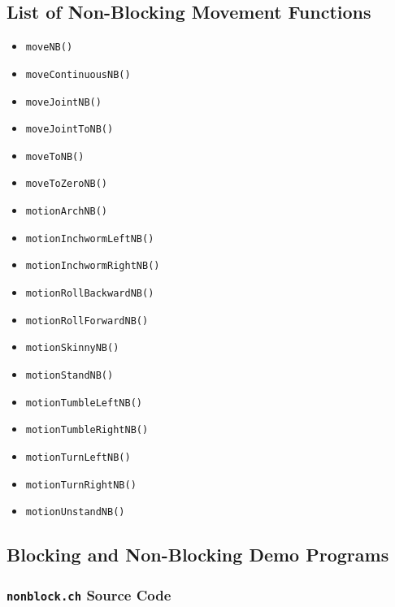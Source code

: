 \documentclass{article}
\begin{document}
\subsection{List of Non-Blocking Movement Functions}
\begin{itemize}
\item \texttt{moveNB()}
\item \texttt{moveContinuousNB()}
\item \texttt{moveJointNB()}
\item \texttt{moveJointToNB()}
\item \texttt{moveToNB()}
\item \texttt{moveToZeroNB()}
\item \texttt{motionArchNB()}
\item \texttt{motionInchwormLeftNB()}
\item \texttt{motionInchwormRightNB()}
\item \texttt{motionRollBackwardNB()}
\item \texttt{motionRollForwardNB()}
\item \texttt{motionSkinnyNB()}
\item \texttt{motionStandNB()}
\item \texttt{motionTumbleLeftNB()}
\item \texttt{motionTumbleRightNB()}
\item \texttt{motionTurnLeftNB()}
\item \texttt{motionTurnRightNB()}
\item \texttt{motionUnstandNB()}
\end{itemize}

\subsection{Blocking and Non-Blocking Demo Programs}
\subsubsection{\texttt{nonblock.ch} Source Code}

\end{document}
